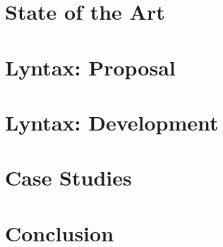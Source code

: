 \documentclass[
  oneside,
  11pt, a4paper,
  footinclude=true,
  cleardoublepage=empty
]{scrbook}
\newcommand\myemptypage{
\null
\thispagestyle{empty}
\addtocounter{page}{-1}
\newpage
}
\begin{document}
	\chapter{State of the Art}
	\label{cha:StateOfTheArt}
    
    
    \chapter{Lyntax: Proposal}
    \label{cha:LyntaxProposal}
    

    \chapter{Lyntax: Development}
    \label{cha:LyntaxDevelopment}
    
    
    \chapter{Case Studies}
    \label{cha:CaseStudies}
    
    
    \chapter{Conclusion}
    \label{cha:Conclusion}
    
    
\myemptypage
\myemptypage
    

	
    

	
    

\end{document}

